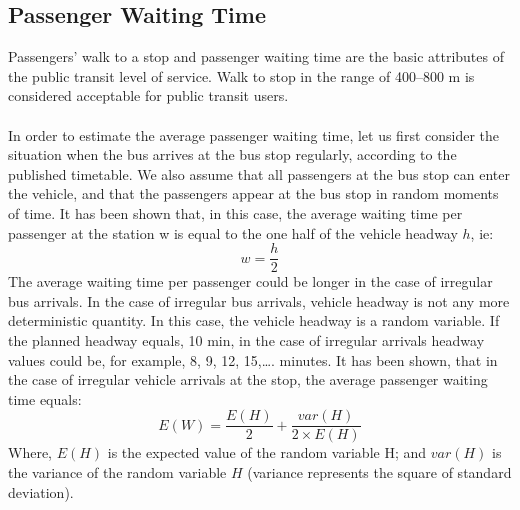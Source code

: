 \subsection{Passenger Waiting Time}
Passengers’ walk to a stop and passenger waiting time are the basic attributes of the public transit level of service. Walk to stop in the range of 400–800 m is considered acceptable for public transit users.\\\\
In order to estimate the average passenger waiting time, let us first consider the situation when the bus arrives at the bus stop regularly, according to the published timetable. We also assume that all passengers at the bus stop can enter the vehicle, and that the passengers appear at the bus stop in random moments of time. It has been shown that, in this case, the average waiting time per passenger at the station w is equal to the one half of the vehicle headway $ h $, ie:
\begin{equation}
	w = \frac{h}{2}
\end{equation}
The average waiting time per passenger could be longer in the case of irregular bus arrivals. In the case of irregular bus arrivals, vehicle headway is not any more deterministic quantity. In this case, the vehicle headway is a random variable. If the planned headway equals, 10 min, in the case of irregular arrivals headway values could be, for example, 8, 9, 12, 15,…. minutes. It has been shown, that in the case of irregular vehicle arrivals at the stop, the average passenger waiting time equals:
\begin{equation}
	E(W) = \frac{E(H)}{2} + \frac{var(H)}{2 \times E(H)}
\end{equation}
Where, $ E(H) $ is the expected value of the random variable H; and $ var(H) $ is the variance of the random variable $ H $ (variance represents the square of standard deviation).
%
